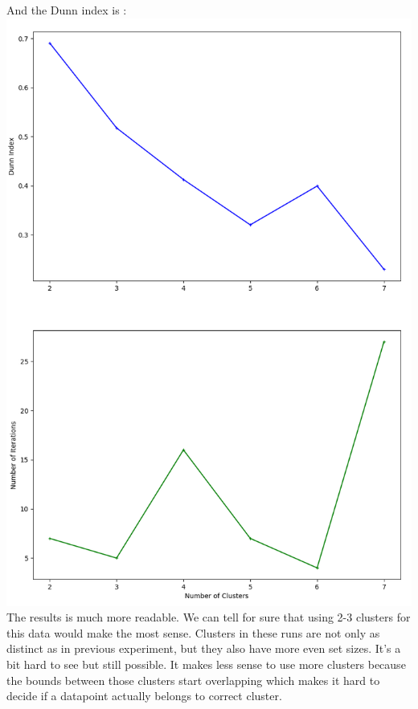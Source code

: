 \documentclass[12pt, letterpaper]{article}
\begin{document}
\begin{enumerate}[label=\Roman*.]
\begin{enumerate}[label=\arabic*.]
		 And the Dunn index is :\\
		  \includegraphics[scale=0.55]{dun_pc2.png} \\
		  
		  The results is much more readable. We can tell for sure that using 2-3 clusters for this data would make the most sense. Clusters in these runs are not only as distinct as in previous experiment, but they also have more even set sizes. It's a bit hard to see but still possible. It makes less sense to use more clusters because the bounds between those clusters start overlapping which makes it hard to decide if a datapoint actually belongs to correct cluster.\\ \\\\\\
	  \end{enumerate}
	 

\end{enumerate}
\end{document}
